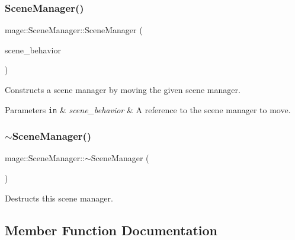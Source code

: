 \subsubsection{\texorpdfstring{Scene\+Manager()}{SceneManager()}\hspace{0.1cm}{\footnotesize\ttfamily [3/3]}}
{\footnotesize\ttfamily mage\+::\+Scene\+Manager\+::\+Scene\+Manager (\begin{DoxyParamCaption}\item[{\hyperlink{classmage_1_1_scene_manager}{Scene\+Manager} \&\&}]{scene\+\_\+behavior }\end{DoxyParamCaption})\hspace{0.3cm}{\ttfamily [default]}}

Constructs a scene manager by moving the given scene manager.


\begin{DoxyParams}[1]{Parameters}
\mbox{\tt in}  & {\em scene\+\_\+behavior} & A reference to the scene manager to move. \\
\hline
\end{DoxyParams}
\hypertarget{classmage_1_1_scene_manager_a849386b052d6ae8945c9554f888e1707}{}\label{classmage_1_1_scene_manager_a849386b052d6ae8945c9554f888e1707} 
\subsubsection{\texorpdfstring{$\sim$\+Scene\+Manager()}{~SceneManager()}}
{\footnotesize\ttfamily mage\+::\+Scene\+Manager\+::$\sim$\+Scene\+Manager (\begin{DoxyParamCaption}{ }\end{DoxyParamCaption})\hspace{0.3cm}{\ttfamily [default]}}

Destructs this scene manager. 

\subsection{Member Function Documentation}
\hypertarget{classmage_1_1_scene_manager_adadc65dc4bd9643c1befd261903309f7}{}\label{classmage_1_1_scene_manager_adadc65dc4bd9643c1befd261903309f7} 
